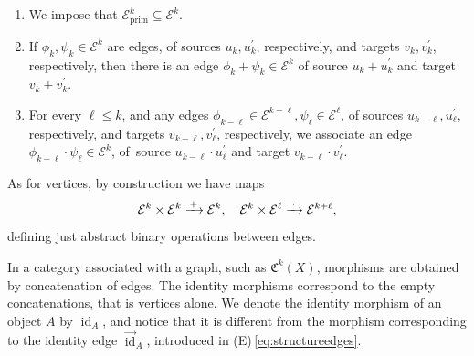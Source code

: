 \documentclass[JEP,XML,SOM,Unicode,published]{cedram}
\newcommand\To[1]{\mathchoice{\xrightarrow{\kern1pt#1\kern1pt}}{\stackrel{#1}{\longrightarrow}}{}{}}
\theoremstyle{plain}
\theoremstyle{definition}
\newcommand{\Ecal}{\mathcal E}
\newcommand{\Cfrak}{\mathfrak C}
\newcommand{\cfrak}{\mathfrak c}
\newcommand{\bis}{\prime\prime}
\newcommand{\prim}{\mathrm{prim}}
\DeclareMathOperator{\id}{id}
\begin{document}
\begin{enumerate}
\begin{enumerate}
\begin{enumerate}
\item\label{item:formal-iso-5} \emph{Whitney formula}. For every exact sequence of vector bundles $0\to E^{\prime}\to E\to E^{\bis}\to 0$ and every integer $k \geq 0$, two edges in $\Ecal^k_{\prim}$:
\begin{displaymath}
\xymatrix@C=1.2cm{
\cfrak_{k}(E) \ar@<.8ex>[r] &\ar@<.8ex>[l]\sum_{i=0}^{k} \cfrak_{i}(E^{\prime}) \cdot \cfrak_{k-i}(E^{\bis}).
}
\end{displaymath}
Here, we follow the convention \eqref{eq:convention-sum} for the reiterated addition.
\item \emph{Isomorphisms of vector bundles}. For every isomorphism of vector bundles $\varphi\colon E\!\to\! F$ and every integer $k \!\geq\! 0$, two edges in~$\Ecal^k_{\prim}$:
\begin{displaymath}
\xymatrix@C=1.2cm{
\cfrak_{k}(E) \ar@<.8ex>[r]^-{[\varphi]_k} & \ar@<.8ex>[l]^-{[\varphi]^{-1}_k} \cfrak_{k}(F).
}
\end{displaymath}
\end{enumerate}
\end{enumerate}
\item We impose that $\Ecal^k_{\prim} \subseteq \Ecal^k$.

\item If $\phi_k, \psi_k \in \Ecal^k$ are edges, of sources $u_{k}, u_{k}^{\prime}$, respectively, and targets $v_{k},v_{k}^{\prime}$, respectively, then there is an edge $\phi_k + \psi_k \in \Ecal^k$ of source $u_{k}+u_{k}^{\prime}$ and target $v_{k}+v_{k}^{\prime}$.

\item For every $\ell\leq k$, and any edges $\phi_{k-\ell} \in \Ecal^{k-\ell}, \psi_\ell \in \Ecal^{\ell}$, of sources $u_{k-\ell}, u_{\ell}^{\prime}$, respectively, and targets $v_{k-\ell},v_{\ell}^{\prime}$, respectively, we associate an edge $\phi_{k-\ell} \cdot \psi_\ell \in \Ecal^{k}$, of~source $u_{k-\ell}\cdot u_{\ell}^{\prime}$ and target $v_{k-\ell}\cdot v_{\ell}^{\prime}$.
\end{enumerate}

As for vertices, by construction we have maps
\begin{equation}\label{eq:operations-edges}
\Ecal^{k}\times\Ecal^{k}\To{+}\Ecal^{k},\quad \Ecal^{k}\times\Ecal^{\ell}\To{\,\cdot\,}\Ecal^{k+\ell},
\end{equation}
defining just abstract binary operations between edges.

In a category associated with a graph, such as $\Cfrak^{k}(X)$, morphisms are obtained by concatenation of edges. The identity morphisms correspond to the empty concatenations, that is vertices alone. We denote the identity morphism of an object $A$ by $\id_A$, and notice that it is different from the morphism corresponding to the identity edge $\overset{\to}{\id}_A$, introduced in (E)\,\eqref{eq:structureedges}.
\end{document}
